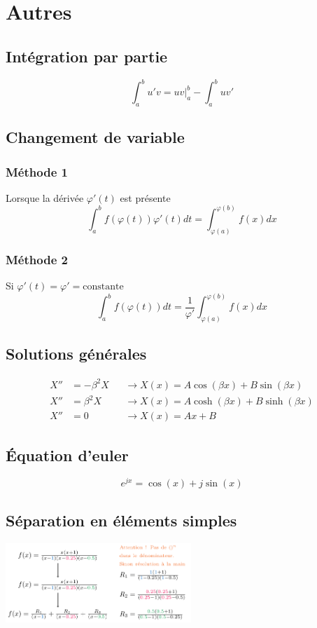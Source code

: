 \documentclass[resume]{subfiles}
\begin{document}
\section{Autres}
\label{sec_autres}
\subsection{Intégration par partie}
$$\int_{a}^{b}u'v=uv\Big|_{a}^{b}-\int_{a}^{b}uv'$$
\subsection{Changement de variable}
\subsubsection{Méthode 1}
Lorsque la dérivée $\varphi'(t)$ est présente 
$$\int_{a}^{b}f(\varphi(t))\varphi'(t)dt=\int_{\varphi(a)}^{\varphi(b)}f(x)dx$$
\subsubsection{Méthode 2}
Si $\varphi'(t)=\varphi'=\text{constante}$
$$\int_{a}^{b}f(\varphi(t))dt=\frac{1}{\varphi'}\int_{\varphi(a)}^{\varphi(b)}f(x)dx$$
\subsection{Solutions générales}
\begin{align*}
X''&=-\beta^2 X&&\longrightarrow X(x)=A\cos(\beta x)+B\sin(\beta x)\\
X''&=\beta^2 X&&\longrightarrow X(x)=A\cosh(\beta x)+B\sinh(\beta x)\\
X''&=0 &&\longrightarrow X(x)=Ax+B
\end{align*}
\subsection{Équation d'euler}
$$e^{jx}=\cos(x)+j\sin(x)$$
\subsection{Séparation en éléments simples}
\begin{center}
\includegraphics[width=7cm]{drwg_6.pdf}
\end{center}
\end{document}
